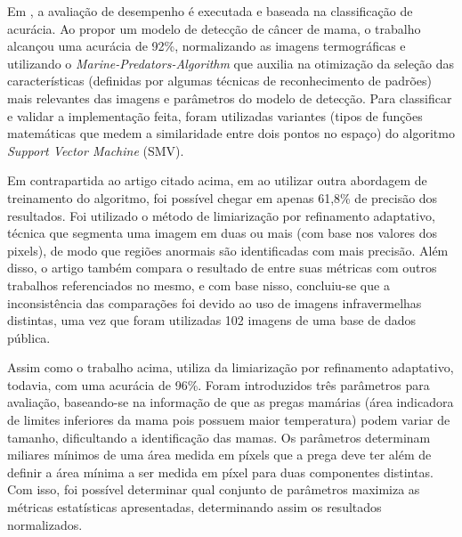 Em , a avaliação de desempenho é executada e baseada na classificação de acurácia. Ao propor um modelo de detecção de câncer de mama, o trabalho alcançou uma acurácia de 92\%, normalizando as imagens termográficas e utilizando o \textit{Marine-Predators-Algorithm} que auxilia na otimização da seleção das características (definidas por algumas técnicas de reconhecimento de padrões) mais relevantes das imagens e parâmetros do modelo de detecção. Para classificar e validar a implementação feita, foram utilizadas variantes (tipos de funções matemáticas que medem a similaridade entre dois pontos no espaço) do algoritmo \textit{Support Vector Machine} (SMV).


Em contrapartida ao artigo citado acima, em  ao utilizar outra abordagem de treinamento do algoritmo, foi possível chegar em apenas 61,8\% de precisão dos resultados. Foi utilizado o método de limiarização por refinamento adaptativo, técnica que segmenta uma imagem em duas ou mais (com base nos valores dos pixels), de modo que regiões anormais são identificadas com mais precisão. Além disso, o artigo também compara o resultado de entre suas métricas com outros trabalhos referenciados no mesmo, e com base nisso, concluiu-se que a inconsistência das comparações foi devido ao uso de imagens infravermelhas distintas, uma vez que foram utilizadas 102 imagens de uma base de dados pública.

Assim como o trabalho acima,  utiliza da limiarização por refinamento adaptativo, todavia, com uma acurácia de 96\%. Foram introduzidos três parâmetros para avaliação, baseando-se na informação de que as pregas mamárias (área indicadora de limites inferiores da mama pois possuem maior temperatura) podem variar de tamanho, dificultando a identificação das mamas. Os parâmetros determinam miliares mínimos de uma área medida em píxels que a prega deve ter além de definir a área mínima a ser medida em píxel para duas componentes distintas. Com isso, foi possível determinar qual conjunto de parâmetros maximiza as métricas estatísticas apresentadas, determinando assim os resultados normalizados.



